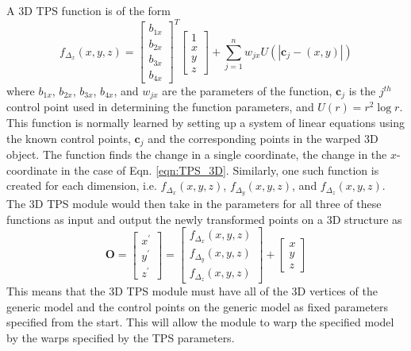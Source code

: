 \documentclass[10pt,twocolumn,letterpaper]{article}
\begin{document}
A 3D TPS function is of the form
\begin{equation}
f_{\Delta_x}\left(x,y,z\right)=\begin{bmatrix}b_{1x}\\b_{2x}\\b_{3x}\\b_{4x}\end{bmatrix}^T\begin{bmatrix}1\\x\\y\\z\end{bmatrix}+\sum_{j=1}^n w_{jx}U\left(|\mathbf{c}_j-\left(x,y\right)|\right)
\label{eqn:TPS_3D}
\end{equation}
where $b_{1x}$, $b_{2x}$, $b_{3x}$, $b_{4x}$, and $w_{jx}$ are the parameters of the function, $\mathbf{c}_j$ is the $j^{th}$ control point used in determining the function parameters, and $U(r)=r^2\log{r}$. This function is normally learned by setting up a system of linear equations using the known control points, $\mathbf{c}_j$ and the corresponding points in the warped 3D object. The function finds the change in a single coordinate, the change in the $x$-coordinate in the case of Eqn. \ref{eqn:TPS_3D}. Similarly, one such function is created for each dimension, i.e. $f_{\Delta_x}\left(x,y,z\right)$, $f_{\Delta_y}\left(x,y,z\right)$, and $f_{\Delta_z}\left(x,y,z\right)$. The 3D TPS module would then take in the parameters for all three of these functions as input and output the newly transformed points on a 3D structure as
\begin{equation}
\mathbf{O}=\begin{bmatrix}x^\prime\\y^\prime\\z^\prime\end{bmatrix}=\begin{bmatrix}f_{\Delta_x}\left(x,y,z\right)\\f_{\Delta_y}\left(x,y,z\right)\\f_{\Delta_z}\left(x,y,z\right)\end{bmatrix}+\begin{bmatrix}x\\y\\z\end{bmatrix}
\end{equation}
This means that the 3D TPS module must have all of the 3D vertices of the generic model and the control points on the generic model as fixed parameters specified from the start. This will allow the module to warp the specified model by the warps specified by the TPS parameters.
\end{document}
